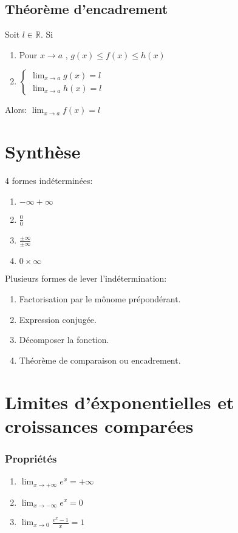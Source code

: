 \documentclass[9pt,twoside]{article}
\begin{document}
\subsection{Théorème d'encadrement}
Soit $l \in \mathbb{R}$. Si 
\begin{enumerate} 
	\item Pour  $x\to a$ ,  $g(x)\leq f(x) \leq h(x)$
	\item $\begin{cases} \lim_{x\to a} g(x)=l \\ \lim_{x\to a} h(x)=l\end{cases}$
\end{enumerate}
Alors: $\lim_{x\to a } f(x) = l$
\section{Synthèse}
4 formes indéterminées:
\begin{enumerate}
	\item $-\infty+\infty$
	\item $\frac{0}{0}$
	\item $\frac{\pm\infty}{\pm\infty}$
	\item $0\times\infty$
\end{enumerate}
Plusieurs formes de lever l'indétermination:
\begin{enumerate}
	\item Factorisation par le mônome prépondérant.
	\item Expression conjugée.
	\item Décomposer la fonction.
	\item Théorème de comparaison ou encadrement.
\end{enumerate}

\section{Limites d'éxponentielles et croissances comparées}

\subsubsection*{Propriétés}
\begin{enumerate}
	\item $\lim_{x\to+\infty}e^x=+\infty$
	\item $\lim_{x\to-\infty}e^x=0$
	\item $\lim_{x\to 0} \frac{e^x-1}{x}=1$
\end{enumerate}
\end{document}
